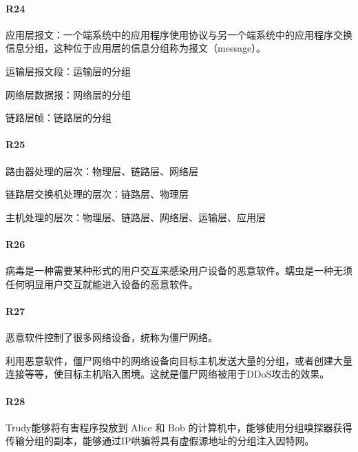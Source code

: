 \paragraph*{R24}
应用层报文：一个端系统中的应用程序使用协议与另一个端系统中的应用程序交换信息分组，这种位于应用层的信息分组称为报文（message）。

运输层报文段：运输层的分组

网络层数据报：网络层的分组

链路层帧：链路层的分组

\paragraph*{R25}
路由器处理的层次：物理层、链路层、网络层

链路层交换机处理的层次：链路层、物理层

主机处理的层次：物理层、链路层、网络层、运输层、应用层

\paragraph*{R26}
病毒是一种需要某种形式的用户交互来感染用户设备的恶意软件。蠕虫是一种无须任何明显用户交互就能进入设备的恶意软件。

\paragraph*{R27}
恶意软件控制了很多网络设备，统称为僵尸网络。

利用恶意软件，僵尸网络中的网络设备向目标主机发送大量的分组，或者创建大量连接等等，使目标主机陷入困境。这就是僵尸网络被用于DDoS攻击的效果。

\paragraph*{R28}
Trudy能够将有害程序投放到 Alice 和 Bob 的计算机中，能够使用分组嗅探器获得传输分组的副本，能够通过IP哄骗将具有虚假源地址的分组注入因特网。
